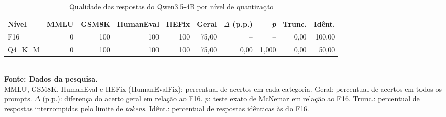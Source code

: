 \begin{table}[htb]
\centering
\caption{Qualidade das respostas do Qwen3.5-4B por nível de quantização}
\label{tab:qualidade-Qwen3.5-4B}
\small
\begin{tabular}{lrrrrrrrrr}
\hline
\textbf{Nível} & \textbf{MMLU} & \textbf{GSM8K} & \textbf{HumanEval} & \textbf{HEFix} & \textbf{Geral} & \textbf{$\Delta$ (p.p.)} & \textbf{\textit{p}} & \textbf{Trunc.} & \textbf{Idênt.} \\
\hline
F16 & 0 & 100 & 100 & 100 & 75,00 & -- & -- & 0,00 & 100,00 \\
Q4\_K\_M & 0 & 100 & 100 & 100 & 75,00 & 0,00 & 1,000 & 0,00 & 50,00 \\
\hline
\end{tabular}
\\[2pt]{\footnotesize \textbf{Fonte: Dados da pesquisa.}}
\\[2pt]{\footnotesize MMLU, GSM8K, HumanEval e HEFix (HumanEvalFix): percentual de acertos em cada categoria. Geral: percentual de acertos em todos os prompts. $\Delta$ (p.p.): diferença do acerto geral em relação ao F16. \textit{p}: teste exato de McNemar em relação ao F16. Trunc.: percentual de respostas interrompidas pelo limite de \textit{tokens}. Idênt.: percentual de respostas idênticas às do F16.}
\end{table}
